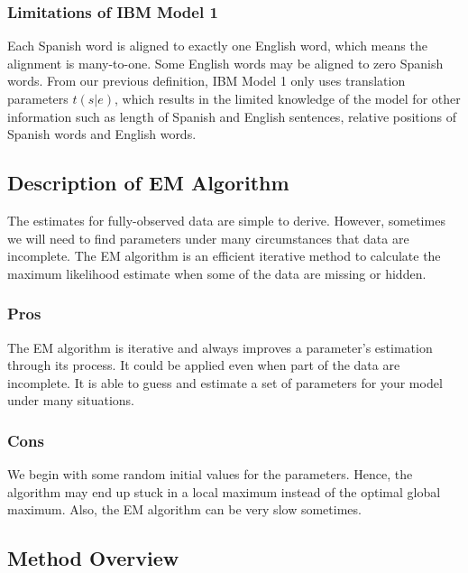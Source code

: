 \subsubsection{\textbf{Limitations of IBM Model 1}}

Each Spanish word is aligned to exactly one English word, which means the alignment is many-to-one. Some English words may be aligned to zero Spanish words. From our previous definition, IBM Model 1 only uses translation parameters $t(s|e)$, which results in the limited knowledge of the model for other information such as length of Spanish and English sentences, relative positions of Spanish words and English words.

\subsection{\textbf{Description of EM Algorithm}}

The estimates for fully-observed data are simple to derive. However, sometimes we will need to find parameters under many circumstances that data are incomplete. The EM algorithm is an efficient iterative method to calculate the maximum likelihood estimate when some of the data are missing or hidden. 

\subsubsection{\textbf{Pros}}

The EM algorithm is iterative and always improves a parameter’s estimation through its process. It could be applied even when part of the data are incomplete. It is able to guess and estimate a set of parameters for your model under many situations.

\subsubsection{\textbf{Cons}}

We begin with some random initial values for the parameters. Hence, the algorithm may end up stuck in a local maximum instead of the optimal global maximum. Also, the EM algorithm can be very slow sometimes.


\subsection{\textbf{Method Overview}}

